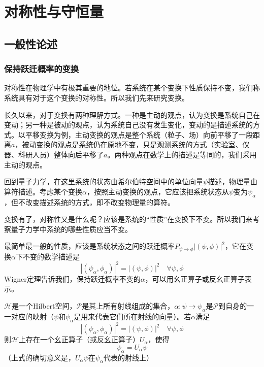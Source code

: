 \section{对称性与守恒量}
\subsection{一般性论述}
\subsubsection{保持跃迁概率的变换}
对称性在物理学中有极其重要的地位。若系统在某个变换下性质保持不变，我们称系统具有对于这个变换的对称性。所以我们先来研究变换。

长久以来，对于变换有两种理解方式。一种是主动的观点，认为变换是系统自己在变动；另一种是被动的观点，认为系统自己没有发生变化，变动的是描述系统的方式。以平移变换为例，主动变换的观点是整个系统（粒子、场）向前平移了一段距离$a$，被动变换的观点是系统仍在原地不变，只是观测系统的方式（实验室、仪器、科研人员）整体向后平移了$a$。两种观点在数学上的描述是等同的，我们采用主动的观点。

回到量子力学，在这里系统的状态由希尔伯特空间中的单位向量$\psi$描述，物理量由算符描述。考虑某个变换$\alpha$，按照主动变换的观点，它应该把系统状态从$\psi$变为$\psi_\alpha$，但不改变描述系统的方式，即不改变物理量的算符。

变换有了，对称性又是什么呢？应该是系统的“性质”在变换下不变。所以我们来考察量子力学中系统的哪些性质应当不变。

最简单最一般的性质，应该是系统状态之间的跃迁概率$P_{\psi\to\phi}|(\psi,\phi)|^2$，它在变换$\alpha$下不变的数学描述是
$$|(\psi_\alpha,\phi_\alpha)|^2=|(\psi,\phi)|^2\quad\forall\psi,\phi$$
Wigner定理告诉我们，保持跃迁概率不变的$\alpha$，可以用幺正算子或反幺正算子表示。
\begin{theorem}[Wigner]
    $\mathcal{H}$是一个Hilbert空间，$\mathcal{P}$是其上所有射线组成的集合，$\alpha:\psi\to\psi_\alpha$是$\mathcal{P}$到自身的一一对应的映射（$\psi$和$\psi_\alpha$是用来代表它们所在射线的向量）。若$\alpha$满足
    $$|(\psi_\alpha,\phi_\alpha)|^2=|(\psi,\phi)|^2\quad \forall\psi,\phi$$
    则$\mathcal{H}$上存在一个幺正算子（或反幺正算子）$U_\alpha$，使得
    $$\psi_\alpha=U_\alpha\psi$$
    （上式的确切意义是，$U_\alpha\psi$在$\psi_\alpha$代表的射线上）
\end{theorem}
